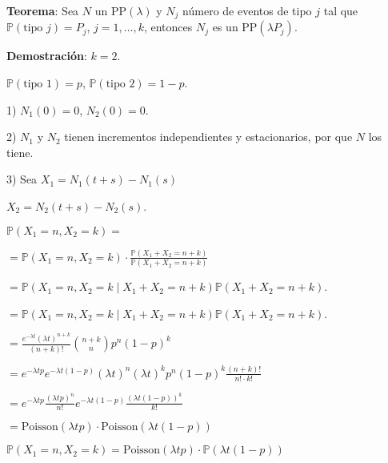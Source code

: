 \documentclass[12pt,a4paper]{article}
\newcommand{\teorema}[1]{%
\begin{teoremabox}
\textbf{Teorema}: #1
\end{teoremabox}
}
\begin{document}
\teorema{Sea $N$ un PP$(\lambda)$ y $N_j$ número de eventos de tipo $j$ tal que $\mathbb{P}(\text{tipo } j) = P_j$, $j = 1, \ldots, k$, entonces $N_j$ es un PP$(\lambda P_j)$.}

\textbf{Demostración}: $k = 2$.

$\mathbb{P}(\text{tipo } 1) = p$, $\mathbb{P}(\text{tipo } 2) = 1 - p$.

1) $N_1(0) = 0$, $N_2(0) = 0$.

2) $N_1$ y $N_2$ tienen incrementos independientes y estacionarios, por que $N$ los tiene.

3) Sea $X_1 = N_1(t+s) - N_1(s)$

$X_2 = N_2(t+s) - N_2(s)$.

$\mathbb{P}(X_1 = n, X_2 = k) =$

$= \mathbb{P}(X_1 = n, X_2 = k) \cdot \frac{\mathbb{P}(X_1 + X_2 = n+k)}{\mathbb{P}(X_1 + X_2 = n+k)}$

$= \mathbb{P}(X_1 = n, X_2 = k \mid X_1 + X_2 = n+k) \mathbb{P}(X_1 + X_2 = n+k)$.

$= \mathbb{P}(X_1 = n, X_2 = k \mid X_1 + X_2 = n+k) \mathbb{P}(X_1 + X_2 = n+k)$.

$= \frac{e^{-\lambda t} (\lambda t)^{n+k}}{(n+k)!} \binom{n+k}{n} p^n (1-p)^k$

\begin{center}
\end{center}

$= e^{-\lambda t p} e^{-\lambda t(1-p)} (\lambda t)^n (\lambda t)^k p^n (1-p)^k \frac{(n+k)!}{n! \cdot k!}$

$= e^{-\lambda t p} \frac{(\lambda t p)^n}{n!} e^{-\lambda t(1-p)} \frac{(\lambda t(1-p))^k}{k!}$

$= \text{Poisson}(\lambda t p) \cdot \text{Poisson}(\lambda t(1-p))$

$\mathbb{P}(X_1 = n, X_2 = k) = \text{Poisson}(\lambda t p) \cdot \mathbb{P}(\lambda t(1-p))$
\end{document}
